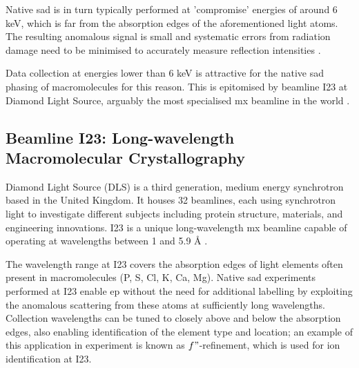 Native \ac{sad} is in turn typically performed at 'compromise' energies of around 6 keV, which is far from the absorption edges of the aforementioned light atoms. The resulting anomalous signal is small and systematic errors from radiation damage need to be minimised to accurately measure reflection intensities \cite{DjinovicCarugo2005}.%

Data collection at energies lower than 6 keV is attractive for the native \ac{sad} phasing of macromolecules for this reason. This is epitomised by beamline I23 at Diamond Light Source, arguably the most specialised \ac{mx} beamline in the world \cite{Foerster2019}. %

\subsection{Beamline I23: Long-wavelength Macromolecular Crystallography}

Diamond Light Source (DLS) is a third generation, medium energy synchrotron based in the United Kingdom. It houses 32 beamlines, each using synchrotron light to investigate different subjects including protein structure, materials, and engineering innovations.
I23 is a unique long-wavelength \ac{mx} beamline capable of operating at wavelengths between 1 and 5.9 Å \cite{Wagner2016}.

The wavelength range at I23 covers the absorption edges of
light elements often present in macromolecules (P, S, Cl, K, Ca, Mg).
Native \ac{sad} experiments performed at I23 enable \ac{ep} without the need for additional labelling by exploiting the anomalous scattering from these atoms at sufficiently long wavelengths.
Collection wavelengths can be tuned to closely above and below the absorption edges, also enabling identification of the element type and location; an example of this application in experiment is known as $f"$-refinement, which is used for ion identification at I23. %

